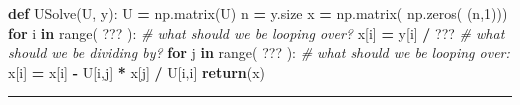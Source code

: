 \documentclass[
]{book}
\newenvironment{Shaded}{\begin{snugshade}}{\end{snugshade}}
\newcommand{\BuiltInTok}[1]{#1}
\newcommand{\CommentTok}[1]{\textcolor[rgb]{0.56,0.35,0.01}{\textit{#1}}}
\newcommand{\ControlFlowTok}[1]{\textcolor[rgb]{0.13,0.29,0.53}{\textbf{#1}}}
\newcommand{\DecValTok}[1]{\textcolor[rgb]{0.00,0.00,0.81}{#1}}
\newcommand{\KeywordTok}[1]{\textcolor[rgb]{0.13,0.29,0.53}{\textbf{#1}}}
\newcommand{\NormalTok}[1]{#1}
\newcommand{\OperatorTok}[1]{\textcolor[rgb]{0.81,0.36,0.00}{\textbf{#1}}}
\theoremstyle{definition}
\theoremstyle{definition}
\theoremstyle{definition}
\theoremstyle{remark}
\begin{document}
\begin{Shaded}
\begin{Highlighting}[]
\KeywordTok{def}\NormalTok{ USolve(U, y):}
\NormalTok{    U }\OperatorTok{=}\NormalTok{ np.matrix(U)}
\NormalTok{    n }\OperatorTok{=}\NormalTok{ y.size}
\NormalTok{    x }\OperatorTok{=}\NormalTok{ np.matrix( np.zeros( (n,}\DecValTok{1}\NormalTok{)))}
    \ControlFlowTok{for}\NormalTok{ i }\KeywordTok{in} \BuiltInTok{range}\NormalTok{( ??? ):     }\CommentTok{\# what should we be looping over?}
\NormalTok{        x[i] }\OperatorTok{=}\NormalTok{ y[i] }\OperatorTok{/}\NormalTok{ ???      }\CommentTok{\# what should we be dividing by?}
        \ControlFlowTok{for}\NormalTok{ j }\KeywordTok{in} \BuiltInTok{range}\NormalTok{( ??? ): }\CommentTok{\# what should we be looping over:}
\NormalTok{            x[i] }\OperatorTok{=}\NormalTok{ x[i] }\OperatorTok{{-}}\NormalTok{ U[i,j] }\OperatorTok{*}\NormalTok{ x[j] }\OperatorTok{/}\NormalTok{ U[i,i]}
    \ControlFlowTok{return}\NormalTok{(x)}
\end{Highlighting}
\end{Shaded}

\begin{center}\rule{0.5\linewidth}{0.5pt}\end{center}
\end{document}
